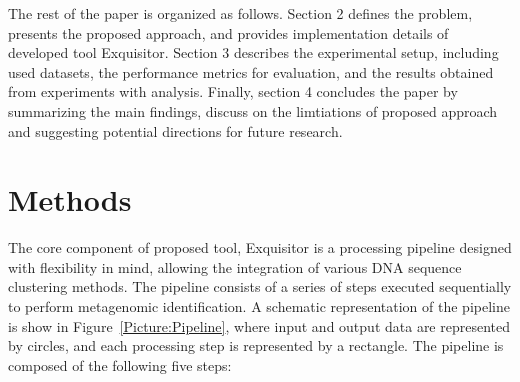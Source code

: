 \documentclass[pdflatex,sn-vancouver-num]{sn-jnl}%
\begin{document}
    The rest of the paper is organized as follows. Section 2 defines the problem, presents the proposed approach, and provides implementation details of developed tool Exquisitor.
    Section 3 describes the experimental setup, including used datasets, the performance metrics for evaluation, and the results obtained from experiments with analysis.
    Finally, section 4 concludes the paper by summarizing the main findings, discuss on the limtiations of proposed approach and suggesting potential directions for future research.

    \section{Methods}

        The core component of proposed tool, Exquisitor is a processing pipeline designed with flexibility in mind, allowing the integration of various DNA sequence clustering methods. The pipeline consists of a series of steps executed sequentially to perform metagenomic identification. A schematic representation of the pipeline is show in Figure~\ref{Picture:Pipeline}, where input and output data are represented by circles, and each processing step is represented by a rectangle. The pipeline is composed of the following five steps:
\end{document}
